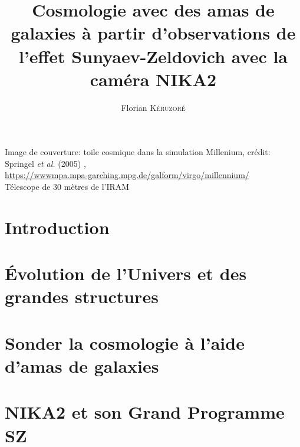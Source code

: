 \documentclass[a4paper, 12pt, twoside]{book}
\title{Cosmologie avec des amas de galaxies à partir d'observations de l'effet Sunyaev-Zeldovich avec la caméra NIKA2}
\author{Florian \textsc{K\'eruzor\'e}}
\date{}
\begin{document}
\begin{titlepage}
    
\end{titlepage}

\phantom{ }
\vfill
{\footnotesize \noindent
    Image de couverture: toile cosmique dans la simulation Millenium,
    crédit: Springel \textit{et al.} (2005) \cite{springel_simulations_2005}, \\
    \url{https://wwwmpa.mpa-garching.mpg.de/galform/virgo/millennium/} \\
    Télescope de 30 mètres de l'IRAM
}

\setlength{\parskip}{2.5pt}
\dominitoc[n]
\tableofcontents
\adjustmtc
\setlength{\parskip}{5pt}


\chapter*{Introduction}
\label{chap:intro}



\chapter{Évolution de l'Univers et des grandes structures}
\label{chap:cosmo1}
\minitoc


\chapter{Sonder la cosmologie à l'aide d'amas de galaxies}
\label{chap:amas}
\minitoc



\chapter{NIKA2 et son Grand Programme SZ}
\label{chap:nika2}
\minitoc

\end{document}
